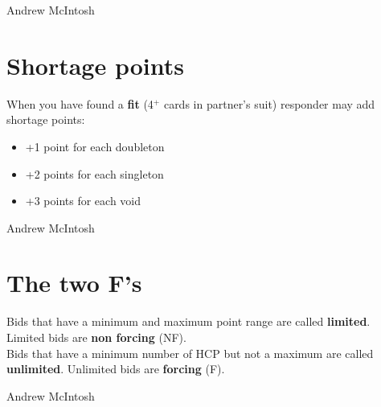 \documentclass[14pt]{extarticle}
\begin{document}
\vspace*{\fill}
\begin{flushbottom}
 \begin{center}
 \tiny
 \textcopyright Andrew McIntosh
\end{center}
\end{flushbottom}


\newpage
\addtocounter{page}{2}
\vspace*{\fill}
\begingroup
\centering

\section*{Shortage points}
\endgroup
\noindent When you have found a \textbf{fit} (4$^{+}$ cards in partner's suit) responder may add shortage points:\\
\begin{itemize}
\item +1 point for each doubleton
\item +2 points for each singleton
\item +3 points for each void
\end{itemize}

\vspace*{\fill}
\begin{flushbottom}
 \begin{center}
 \tiny
 \textcopyright Andrew McIntosh
\end{center}
\end{flushbottom}



\newpage
\addtocounter{page}{5}
\vspace*{\fill}
\begingroup
\centering
\section*{The two F's}
\endgroup
\noindent Bids that have a minimum and maximum point range are called \textbf{limited}. Limited bids are \textbf{non forcing} (NF).\\

\noindent Bids that have a minimum number of HCP but not a maximum  are called \textbf{unlimited}. Unlimited bids are \textbf{forcing} (F).

\vspace*{\fill}
\begin{flushbottom}
 \begin{center}
 \tiny
 \textcopyright Andrew McIntosh
\end{center}
\end{flushbottom}
\end{document}
